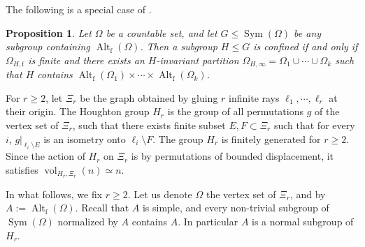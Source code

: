 \documentclass[11pt]{amsart}
\newcommand{\Z}{\ensuremath{\mathbb{Z}}}%
\newcommand{\Sym}{\ensuremath{\operatorname{Sym}}}%
\newcommand{\Alt}{\ensuremath{\operatorname{Alt}}}%
\newcommand{\vol}{\ensuremath{\operatorname{vol}}}%
\theoremstyle{definition}
\theoremstyle{plain}
\newtheorem{prop}[defin]{Proposition}
\theoremstyle{remark}
\begin{document}
The following is a special case of \cite[Proposition 3.7]{LB-MB-ht}. 

\begin{prop}\label{p-confined-partially-finitary}
Let $\Omega$ be a countable set, and let $G \leq \Sym(\Omega)$ be any subgroup containing $\Alt_{\mathrm{f}}(\Omega)$.  Then a subgroup $H\le G$ is confined if and only if $\Omega_{H, \mathrm{f}}$ is finite and there exists an $H$-invariant partition $\Omega_{H,\infty} = \Omega_1 \cup \cdots \cup \Omega_k$ such that $H$ contains $\Alt_{\mathrm{f}}(\Omega_1) \times \cdots \times \Alt_{\mathrm{f}}(\Omega_k)$.
\end{prop}



For $r\ge 2$, let $\Xi_r$ be the graph obtained by gluing $r$ infinite rays $\ell_1, \cdots, \ell_r$ at their origin. The Houghton group $H_r$ is the group of all permutations $g$ of the vertex set of $\Xi_r$, such that there exists finite subset $E, F\subset \Xi_r$ such that for every $i$,  $g|_{\ell_i\setminus E}$ is an isometry onto $\ell_i\setminus F$. 
The group $H_r$ is finitely generated for $r \ge 2$. Since the action of $H_r$ on $\Xi_r$ is by permutations of bounded displacement, it satisfies $\vol_{H_r, \Xi_r}(n)\simeq n$. %

In what follows, we fix $r\ge 2$. Let us denote $\Omega$ the vertex set of $\Xi_r$,  and by $A:=\Alt_{\mathrm{f}}(\Omega)$. Recall that $A$ is simple, and every non-trivial subgroup of $\Sym(\Omega)$ normalized by $A$ contains $A$. In particular $A$ is a normal subgroup of $H_r$. 

\end{document}
